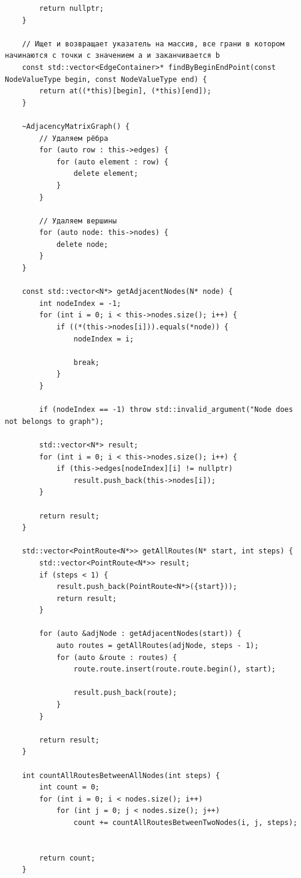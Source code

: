 \documentclass[a4paper,14pt]{extarticle}
\begin{document}
\begin{enumerate}[1.]
\begin{verbatim}
        return nullptr;
    }

    // Ищет и возвращает указатель на массив, все грани в котором начинаются с точки с значением a и заканчивается b
    const std::vector<EdgeContainer>* findByBeginEndPoint(const NodeValueType begin, const NodeValueType end) {
        return at((*this)[begin], (*this)[end]);
    }

    ~AdjacencyMatrixGraph() {
        // Удаляем рёбра
        for (auto row : this->edges) {
            for (auto element : row) {
                delete element;
            }
        }

        // Удаляем вершины
        for (auto node: this->nodes) {
            delete node;
        }
    }

    const std::vector<N*> getAdjacentNodes(N* node) {
        int nodeIndex = -1;
        for (int i = 0; i < this->nodes.size(); i++) {
            if ((*(this->nodes[i])).equals(*node)) { 
                nodeIndex = i;
            
                break;
            }
        }

        if (nodeIndex == -1) throw std::invalid_argument("Node does not belongs to graph");

        std::vector<N*> result;
        for (int i = 0; i < this->nodes.size(); i++) {
            if (this->edges[nodeIndex][i] != nullptr)
                result.push_back(this->nodes[i]);
        }

        return result;
    }

    std::vector<PointRoute<N*>> getAllRoutes(N* start, int steps) {
        std::vector<PointRoute<N*>> result;
        if (steps < 1) {
            result.push_back(PointRoute<N*>({start}));
            return result;
        }

        for (auto &adjNode : getAdjacentNodes(start)) {
            auto routes = getAllRoutes(adjNode, steps - 1);
            for (auto &route : routes) {
                route.route.insert(route.route.begin(), start);

                result.push_back(route);
            }
        }

        return result;
    }

    int countAllRoutesBetweenAllNodes(int steps) {
        int count = 0;
        for (int i = 0; i < nodes.size(); i++)
            for (int j = 0; j < nodes.size(); j++) 
                count += countAllRoutesBetweenTwoNodes(i, j, steps);


        return count;
    }


\end{verbatim}
\end{enumerate}
\end{document}
